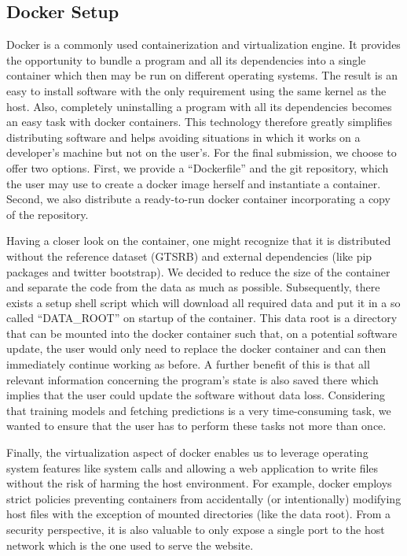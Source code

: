 \subsection{Docker Setup}\label{subsec:docker}
Docker is a commonly used containerization and virtualization engine.
It provides the opportunity to bundle a program and all its dependencies into a single container which then may be run on different operating systems.
The result is an easy to install software with the only requirement  using the same kernel as the host.
Also, completely uninstalling a program with all its dependencies becomes an easy task with docker containers.
This technology therefore greatly simplifies distributing software and helps avoiding situations in which it works on a developer's machine but not on the user's.
For the final submission, we choose to offer two options.
First, we provide a \enquote{Dockerfile} and the git repository, which the user may use to create a docker image herself and instantiate a container.
Second, we also distribute a ready-to-run docker container incorporating a copy of the repository.

Having a closer look on the container, one might recognize that it is distributed without the reference dataset (GTSRB) and external dependencies (like pip packages and twitter bootstrap).
We decided to reduce the size of the container and separate the code from the data as much as possible.
Subsequently, there exists a setup shell script which will download all required data and put it in a so called \enquote{DATA\_ROOT} on startup of the container.
This data root is a directory that can be mounted into the docker container such that, on a potential software update, the user would only need to replace the docker container and can then immediately continue working as before.
A further benefit of this is that all relevant information concerning the program's state is also saved there which implies that the user could update the software without data loss.
Considering that training models and fetching predictions is a very time-consuming task, we wanted to ensure that the user has to perform these tasks not more than once.

Finally, the virtualization aspect of docker enables us to leverage operating system features like system calls and allowing a web application to write files without the risk of harming the host environment.
For example, docker employs strict policies preventing containers from accidentally (or intentionally) modifying host files with the exception of mounted directories (like the data root).
From a security perspective, it is also valuable to only expose a single port to the host network which is the one used to serve the website.
